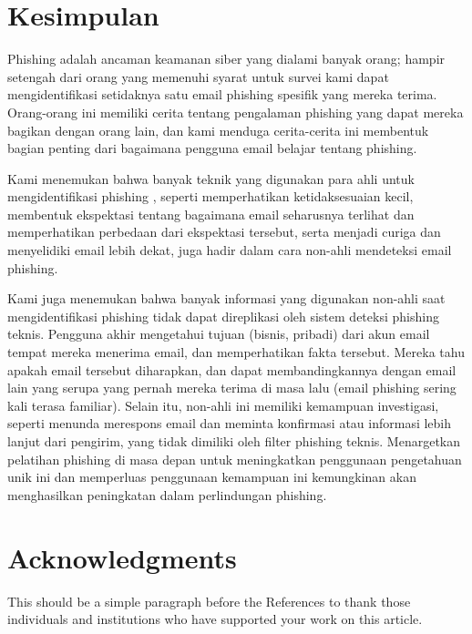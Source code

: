 \documentclass[lettersize,journal]{IEEEtran}
\begin{document}
\section{Kesimpulan}
Phishing adalah ancaman keamanan siber yang dialami banyak orang; hampir
setengah dari orang yang memenuhi syarat untuk survei kami dapat
mengidentifikasi setidaknya satu email phishing spesifik yang mereka terima.
Orang-orang ini memiliki cerita tentang pengalaman phishing yang dapat mereka
bagikan dengan orang lain, dan kami menduga cerita-cerita ini membentuk bagian
penting dari bagaimana pengguna email belajar tentang phishing.

Kami menemukan bahwa banyak teknik yang digunakan para ahli untuk
mengidentifikasi phishing \cite{tigaempat}, seperti memperhatikan
ketidaksesuaian kecil, membentuk ekspektasi tentang bagaimana email seharusnya
terlihat dan memperhatikan perbedaan dari ekspektasi tersebut, serta menjadi
curiga dan menyelidiki email lebih dekat, juga hadir dalam cara non-ahli
mendeteksi email phishing.

Kami juga menemukan bahwa banyak informasi yang digunakan non-ahli saat
mengidentifikasi phishing tidak dapat direplikasi oleh sistem deteksi phishing
teknis. Pengguna akhir mengetahui tujuan (bisnis, pribadi) dari akun email
tempat mereka menerima email, dan memperhatikan fakta tersebut. Mereka tahu
apakah email tersebut diharapkan, dan dapat membandingkannya dengan email lain
yang serupa yang pernah mereka terima di masa lalu (email phishing sering kali
terasa familiar). Selain itu, non-ahli ini memiliki kemampuan investigasi,
seperti menunda merespons email dan meminta konfirmasi atau informasi lebih
lanjut dari pengirim, yang tidak dimiliki oleh filter phishing teknis.
Menargetkan pelatihan phishing di masa depan untuk meningkatkan penggunaan
pengetahuan unik ini dan memperluas penggunaan kemampuan ini kemungkinan akan
menghasilkan peningkatan dalam perlindungan phishing.

\section*{Acknowledgments}
This should be a simple paragraph before the References to thank those individuals and institutions who have supported your work on this article.
\end{document}
